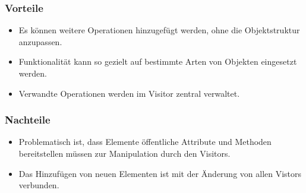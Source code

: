 \subsubsection{Vorteile}
\begin{itemize}
\item Es können weitere Operationen hinzugefügt werden, ohne die Objektstruktur anzupassen.
\item Funktionalität kann so gezielt auf bestimmte Arten von Objekten eingesetzt werden.
\item Verwandte Operationen werden im Visitor zentral verwaltet.
\end{itemize}
\subsubsection{Nachteile}
\begin{itemize}

\item Problematisch ist, dass Elemente öffentliche Attribute und Methoden bereitstellen müssen zur Manipulation durch den Visitors. 
\item Das Hinzufügen von neuen Elementen ist mit der Änderung von allen Vistors verbunden.
\end{itemize}